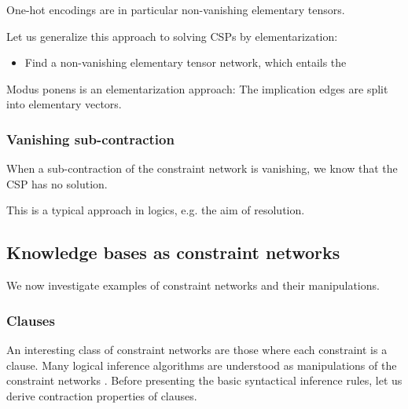 One-hot encodings are in particular non-vanishing elementary tensors.

Let us generalize this approach to solving CSPs by elementarization:
\begin{itemize}
    \item Find a non-vanishing elementary tensor network, which entails the
\end{itemize}

Modus ponens is an elementarization approach: The implication edges are split into elementary vectors.

\subsubsection{Vanishing sub-contraction}

When a sub-contraction of the constraint network is vanishing, we know that the CSP has no solution.

This is a typical approach in logics, e.g. the aim of resolution.




\subsection{Knowledge bases as constraint networks}

We now investigate examples of constraint networks and their manipulations.

\subsubsection{Clauses}

An interesting class of constraint networks are those where each constraint is a clause.
Many logical inference algorithms are understood as manipulations of the constraint networks \cite{brachman_knowledge_2014}.
Before presenting the basic syntactical inference rules, let us derive contraction properties of clauses.

